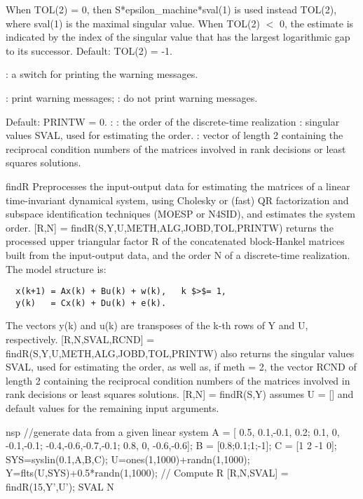 \begin{parameters}
\begin{varlist}
\begin{varlist}
      When  TOL(2) = 0,  then  S*epsilon\_machine*sval(1)  is used instead TOL(2),  where  sval(1)  is the maximal singular value. When  TOL(2) $<$ 0,  the estimate is indicated by the index of the singular value that has the largest logarithmic gap to its successor. Default:    TOL(2) = -1.
    \end{varlist}
    : a switch for printing the warning messages.
    \begin{varlist}
      : print warning messages;
      : do not print warning messages.
    \end{varlist}
    Default: PRINTW = 0.
    :
    : the order of the discrete-time realization
    : singular values SVAL, used for estimating the order.
    : vector of length 2 containing the reciprocal condition numbers of the matrices involved in rank decisions or least squares solutions.
  \end{varlist}
\end{parameters}
\begin{mandescription}
  findR   Preprocesses the input-output data for estimating the matrices 
  of a linear time-invariant dynamical system, using Cholesky or
  (fast) QR factorization and subspace identification techniques 
  (MOESP or N4SID), and estimates the system order.
  [R,N] = findR(S,Y,U,METH,ALG,JOBD,TOL,PRINTW)  returns the processed
  upper triangular factor  R  of the concatenated block-Hankel matrices 
  built from the input-output data, and the order  N  of a discrete-time
  realization. The model structure is:
\begin{verbatim}
  x(k+1) = Ax(k) + Bu(k) + w(k),   k $>$= 1,
  y(k)   = Cx(k) + Du(k) + e(k).
\end{verbatim}
The vectors y(k) and u(k) are transposes of the k-th rows of Y and U,
respectively.
[R,N,SVAL,RCND] = findR(S,Y,U,METH,ALG,JOBD,TOL,PRINTW)  also returns
the singular values SVAL, used for estimating the order, as well as,
if meth = 2, the vector RCND of length 2 containing the reciprocal
condition numbers of the matrices involved in rank decisions or least
squares solutions.
[R,N] = findR(S,Y)  assumes U = [] and default values for the
remaining input arguments.
\end{mandescription}
\begin{examples}
  \begin{mintednsp}{nsp}
    //generate data from a given linear system
    A = [ 0.5, 0.1,-0.1, 0.2;
      0.1, 0,  -0.1,-0.1;      
      -0.4,-0.6,-0.7,-0.1;  
      0.8, 0,  -0.6,-0.6];      
    B = [0.8;0.1;1;-1];
    C = [1 2 -1 0];
    SYS=syslin(0.1,A,B,C);
    U=ones(1,1000)+randn(1,1000);
    Y=flts(U,SYS)+0.5*randn(1,1000);
    // Compute R
    [R,N,SVAL] = findR(15,Y',U');
    SVAL
    N
  \end{mintednsp}
\end{examples}
\begin{manseealso}
         
\end{manseealso}
